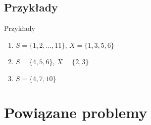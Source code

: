 \documentclass{beamer}
\begin{document}
	\subsection{Przykłady}
		\begin{frame}{Przykłady}
			\begin{enumerate}
				\item $ S = \lbrace 1,2,...,11 \rbrace $, $ X = \lbrace 1,3,5,6 \rbrace $
				\pause \item $ S = \lbrace 4,5,6 \rbrace $, $ X = \lbrace 2,3 \rbrace $
				\pause \item $ S =  \lbrace 4,7,10 \rbrace $
			\end{enumerate}						
		\end{frame}
		
\section{Powiązane problemy}
\end{document}
